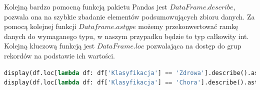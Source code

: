 \documentclass[a4paper,12pt,oneside]{book}
\begin{document}
Kolejną bardzo pomocną funkcją pakietu Pandas jest $DataFrame.describe$, pozwala ona na szybkie zbadanie elementów podsumowujących zbioru danych. Za pomocą kolejnej funkcji $Dataframe.astype$ możemy przekonwertować ramkę danych do wymaganego typu, w naszym przypadku będzie to typ całkowity int. Kolejną kluczową funkcją jest $DataFrame.loc$ pozwalająca na dostęp do grup rekordów na podstawie ich wartości.

\begin{lstlisting}[language=Python, caption=Wykorzystanie funkcji \textit{DataFrame.loc}]
display(df.loc[lambda df: df['Klasyfikacja'] == 'Zdrowa'].describe().astype(int))
display(df.loc[lambda df: df['Klasyfikacja'] == 'Chora'].describe().astype(int))
\end{lstlisting}

\begin{center}
\end{center}
\end{document}
